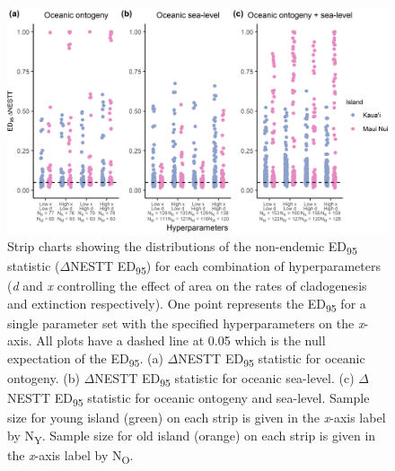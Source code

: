 \begin{figure}
    \centering
    \includegraphics{oceanic_hyperparameters_nonendemic_nltt.png}
    \caption{Strip charts showing the distributions of the non-endemic ED\textsubscript{95} statistic ($\Delta$NESTT ED\textsubscript{95}) for each combination of hyperparameters (\textit{d} and \textit{x} controlling the effect of area on the rates of cladogenesis and extinction respectively). One point represents the ED\textsubscript{95} for a single parameter set with the specified hyperparameters on the \textit{x}-axis. All plots have a dashed line at 0.05 which is the null expectation of the ED\textsubscript{95}. (a) $\Delta$NESTT ED\textsubscript{95} statistic for oceanic ontogeny. (b) $\Delta$NESTT ED\textsubscript{95} statistic for oceanic sea-level. (c) $\Delta$NESTT ED\textsubscript{95} statistic for oceanic ontogeny and sea-level. Sample size for young island (green) on each strip is given in the \textit{x}-axis label by N\textsubscript{Y}. Sample size for old island (orange) on each strip is given in the \textit{x}-axis label by N\textsubscript{O}.}
    \label{fig:oceanic_hyperparamters_nonendemic_nltt}
\end{figure}
 
